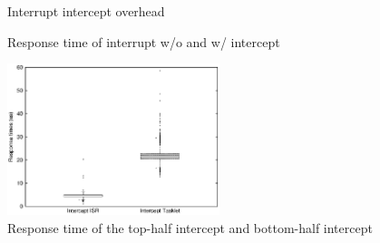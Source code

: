 \begin{figure}[!t]
\begin{minipage}[t]{0.33\hsize}
\begin{center}
\end{center}
\caption{\small{Interrupt intercept overhead \newline \,}}
\label{fig:irq_overhead}
\end{minipage}
\begin{minipage}[t]{0.33\hsize}
\begin{center}
\end{center}
\caption{\small{Response time of interrupt w/o and w/ intercept}}
\label{fig:response}
\end{minipage}
\begin{minipage}[t]{0.33\hsize}
\begin{center}
\includegraphics[width=62mm]{img/tasklet_vs_interrupt}
\end{center}
\caption{\small{Response time of the top-half intercept and bottom-half intercept}}
\label{fig:bottomvstasklet}
\end{minipage}
\end{figure}

